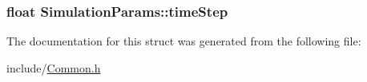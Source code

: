 \label{structSimulationParams_a2516973b9fe3e512b3be4c85c821d86c}
\hypertarget{structSimulationParams_af816d0869faeba8f789e5683fb6d7afb}{
\subsubsection[{timeStep}]{\setlength{\rightskip}{0pt plus 5cm}float {\bf SimulationParams::timeStep}}}
\label{structSimulationParams_af816d0869faeba8f789e5683fb6d7afb}


The documentation for this struct was generated from the following file:\begin{DoxyCompactItemize}
\item 
include/\hyperlink{Common_8h}{Common.h}\end{DoxyCompactItemize}
